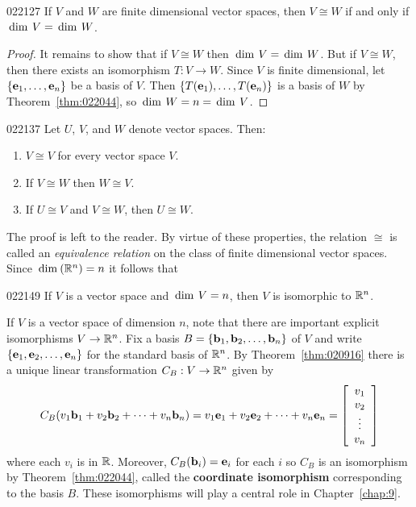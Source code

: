 \begin{theorem}{}{022127}
If $V$ and $W$ are finite dimensional vector spaces, then $V \cong W$ if and only if $\thinspace\operatorname{dim \medspace}V = \thinspace\operatorname{dim \medspace}W$.
\end{theorem}

\begin{proof}
It remains to show that if $V \cong W$ then $\thinspace\operatorname{dim \medspace}V = \thinspace\operatorname{dim \medspace}W$. But if $V \cong W$, then there exists an isomorphism $T : V \to W$. Since $V$ is finite dimensional, let $\{\textbf{e}_{1}, \dots, \textbf{e}_{n}\}$ be a basis of $V$. Then $\{T(\textbf{e}_{1}), \dots, T(\textbf{e}_{n})\}$ is a basis of $W$ by Theorem~\ref{thm:022044}, so $\thinspace\operatorname{dim \medspace}W = n = \thinspace\operatorname{dim \medspace}V$.
\end{proof}

\begin{corollary}{}{022137}
Let $U$, $V$, and $W$ denote vector spaces. Then:


\begin{enumerate}
\item $V \cong V$ for every vector space $V$.

\item If $V \cong W$ then $W \cong V$.

\item If $U \cong V$ and $V \cong W$, then $U \cong W$.

\end{enumerate}
\end{corollary}

\noindent The proof is left to the reader. By virtue of these properties, the relation $\cong$ is called an \textit{equivalence relation} on the class of finite dimensional vector spaces. Since $\thinspace\operatorname{dim\medspace}(\mathbb{R}^n) = n$ it follows that


\begin{corollary}{}{022149}
If $V$ is a vector space and $\thinspace\operatorname{dim \medspace}V = n$, then $V$ is isomorphic to $\mathbb{R}^n$.
\end{corollary}

If $V$ is a vector space of dimension $n$, note that there are important explicit isomorphisms $V \to \mathbb{R}^n$. Fix a basis $B = \{\textbf{b}_{1}, \textbf{b}_{2}, \dots, \textbf{b}_{n}\}$ of $V$ and write $\{\textbf{e}_{1}, \textbf{e}_{2}, \dots, \textbf{e}_{n}\}$ for the standard basis of $\mathbb{R}^n$. By Theorem~\ref{thm:020916} there is a unique linear transformation $C_{B} : V \to \mathbb{R}^n$ given by
\begin{equation*}
C_B(v_1\textbf{b}_1 + v_2\textbf{b}_2 + \cdots +  v_n\textbf{b}_n) = v_1\textbf{e}_1 + v_2\textbf{e}_2 + \cdots + v_n\textbf{e}_n = \left[ \begin{array}{c}
v_1 \\
v_2 \\
\vdots \\
v_n
\end{array} \right]
\end{equation*}
where each $v_{i}$ is in $\mathbb{R}$. Moreover, $C_{B}(\textbf{b}_{i}) = \textbf{e}_{i}$ for each $i$ so $C_{B}$ is an isomorphism by Theorem~\ref{thm:022044}, called the \textbf{coordinate isomorphism} corresponding to the basis $B$. These isomorphisms will play a central role in Chapter~\ref{chap:9}.


